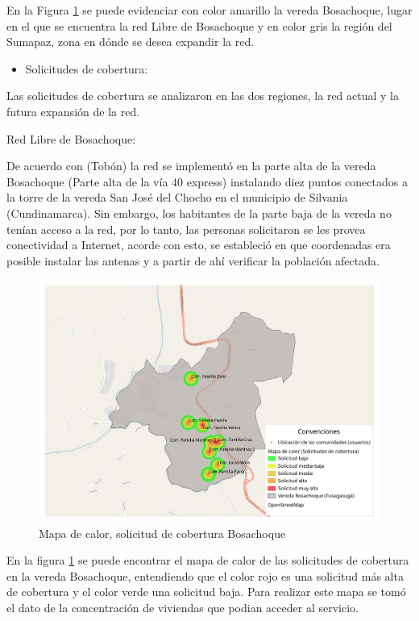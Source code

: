 \documentclass[]{article}
\providecommand{\tightlist}{%
  \setlength{\itemsep}{0pt}\setlength{\parskip}{0pt}}
\begin{document}
En la Figura \ref{mylabel} se puede evidenciar con color amarillo la
vereda Bosachoque, lugar en el que se encuentra la red Libre de
Bosachoque y en color gris la región del Sumapaz, zona en dónde se desea
expandir la red.

\begin{itemize}
\tightlist
\item
  Solicitudes de cobertura:
\end{itemize}

Las solicitudes de cobertura se analizaron en las dos regiones, la red
actual y la futura expansión de la red.

Red Libre de Bosachoque:

De acuerdo con (Tobón) la red se implementó en la parte alta de la
vereda Bosachoque (Parte alta de la vía 40 express) instalando diez
puntos conectados a la torre de la vereda San José del Chocho en el
municipio de Silvania (Cundinamarca). Sin embargo, los habitantes de la
parte baja de la vereda no tenían acceso a la red, por lo tanto, las
personas solicitaron se les provea conectividad a Internet, acorde con
esto, se estableció en que coordenadas era posible instalar las antenas
y a partir de ahí verificar la población afectada.

\begin{figure}
\centering
\includegraphics[width=1.00000\textwidth]{mc_b_solicitudes.pdf}
\caption{Mapa de calor, solicitud de cobertura Bosachoque
\label{mylabel}}
\end{figure}

En la figura \ref{mylabel} se puede encontrar el mapa de calor de las
solicitudes de cobertura en la vereda Bosachoque, entendiendo que el
color rojo es una solicitud más alta de cobertura y el color verde una
solicitud baja. Para realizar este mapa se tomó el dato de la
concentración de viviendas que podian acceder al servicio.
\end{document}
